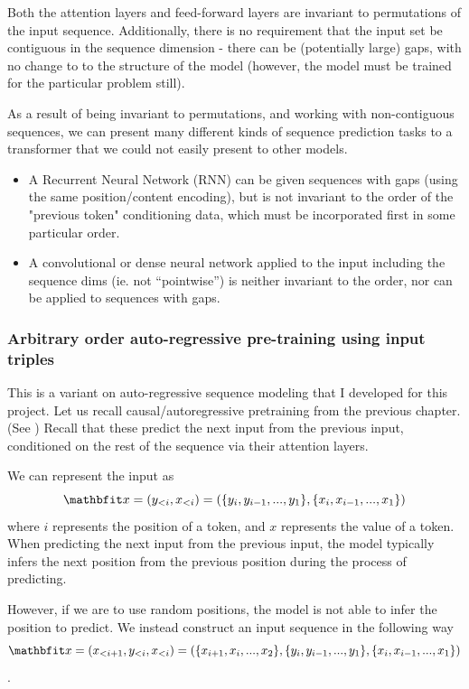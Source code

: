 Both the attention layers and feed-forward layers are invariant to permutations of the input sequence. Additionally, there is no requirement that the input set be contiguous in the sequence dimension - there can be (potentially large) gaps, with no change to to the structure of the model (however, the model must be trained for the particular problem still).

As a result of being invariant to permutations, and working with non-contiguous sequences, we can present many different kinds of sequence prediction tasks to a transformer that we could not easily present to other models.

\begin{itemize}
    \item A Recurrent Neural Network (RNN) can be given sequences with gaps (using the same position/content encoding), but is not invariant to the order of the "previous token" conditioning data, which must be incorporated first in some particular order.
    \item A convolutional or dense neural network applied to the input including the sequence dims (ie. not ``pointwise'') is neither invariant to the order, nor can be applied to sequences with gaps.
\end{itemize}

\subsubsection{Arbitrary order auto-regressive pre-training using input triples}
\label{sss:pretraining-triples}

This is a variant on auto-regressive sequence modeling that I developed for this project. Let us recall causal/autoregressive pretraining from the previous chapter. (See ) Recall that these predict the next input from the previous input, conditioned on the rest of the sequence via their attention layers.

We can represent the input as
$$
   \x = (y_{<i}, x_{<i}) = ( \{ y_i, y_{i-1}, ..., y_1 \}, \{ x_i, x_{i-1}, ..., x_1 \} )
$$
where $i$ represents the position of a token, and $x$ represents the value of a token. When predicting the next input from the previous input, the model typically infers the next position from the previous position during the process of predicting.

However, if we are to use random positions, the model is not able to infer the position to predict. We instead construct an input sequence in the following way
$$
   \x = (x_{<i+1}, y_{<i}, x_{<i}) = ( \{ x_{i+1}, x_{i}, ..., x_2 \}, \{ y_i, y_{i-1}, ..., y_1 \}, \{ x_i, x_{i-1}, ..., x_1 \} )
$$.

